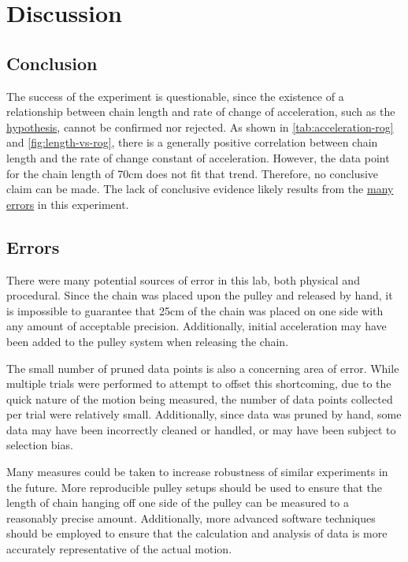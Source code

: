 \documentclass[stu,biblatex,floatsintext,draftall]{apa7}
\begin{document}
\section{Discussion}

\subsection{Conclusion}
The success of the experiment is questionable, since the existence of a relationship between chain length and rate of change of acceleration, such as the \hyperref[sec:hypothesis]{hypothesis}, cannot be confirmed nor rejected. As shown in \autoref{tab:acceleration-rog} and \autoref{fig:length-vs-rog}, there is a generally positive correlation between chain length and the rate of change constant of acceleration. However, the data point for the chain length of 70\unit{\centi\meter} does not fit that trend. Therefore, no conclusive claim can be made. The lack of conclusive evidence likely results from the \hyperref[sec:errors]{many errors} in this experiment.

\subsection{Errors}\label{sec:errors}
There were many potential sources of error in this lab, both physical and procedural. Since the chain was placed upon the pulley and released by hand, it is impossible to guarantee that 25\unit{\centi\meter} of the chain was placed on one side with any amount of acceptable precision. Additionally, initial acceleration may have been added to the pulley system when releasing the chain.

The small number of pruned data points is also a concerning area of error. While multiple trials were performed to attempt to offset this shortcoming, due to the quick nature of the motion being measured, the number of data points collected per trial were relatively small. Additionally, since data was pruned by hand, some data may have been incorrectly cleaned or handled, or may have been subject to selection bias.

Many measures could be taken to increase robustness of similar experiments in the future. More reproducible pulley setups should be used to ensure that the length of chain hanging off one side of the pulley can be measured to a reasonably precise amount. Additionally, more advanced software techniques should be employed to ensure that the calculation and analysis of data is more accurately representative of the actual motion.
\end{document}

